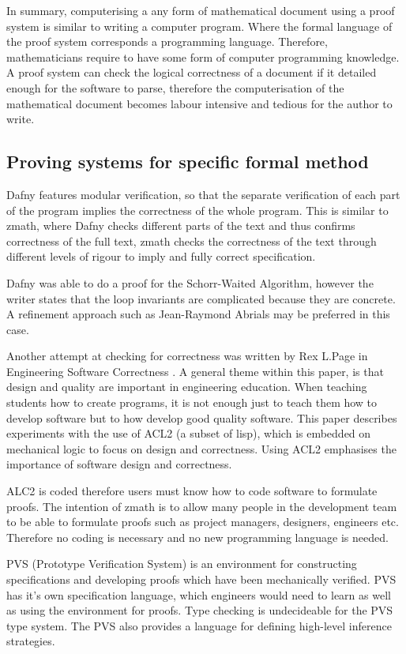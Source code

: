 In summary, computerising a any form of mathematical document using a proof system is similar to writing a computer program. Where the formal language of the proof system corresponds a programming language. Therefore, mathematicians require to have some form of computer programming knowledge. A proof system can check the logical correctness of a document if it detailed enough for the software to parse, therefore the computerisation of the mathematical document becomes labour intensive and tedious for the author to write.

\subsection{Proving systems for specific formal method}


Dafny \cite{dafny} features modular verification, so that the separate verification of each part of the program implies the correctness of the whole program. This is similar to \gls{zmath}, where Dafny checks different parts of the text and thus confirms correctness of the full text, \gls{zmath} checks the correctness of the text through different levels of rigour to imply and fully correct specification.

Dafny was able to do a proof for the Schorr-Waited Algorithm, however the writer states that the loop invariants are complicated because they are concrete. A refinement approach such as Jean-Raymond Abrials \cite{abrial} may be preferred in this case.  

Another attempt at checking for correctness was written by Rex L.Page in Engineering Software Correctness \cite{engineeringsoftwarecorrectness}. A general theme within this paper, is that design and quality are important in engineering education. When teaching students how to create programs, it is not enough just to teach them how to develop software but to how develop good quality software. This paper describes experiments with the use of ACL2 (a subset of lisp), which is embedded on mechanical logic to focus on design and correctness. Using ACL2 emphasises the importance of software design and correctness. 

ALC2 is coded therefore users must know how to code software to formulate proofs. The intention of \gls{zmath} is to allow many people in the development team to be able to formulate proofs such as project managers, designers, engineers etc. Therefore no coding is necessary and no new programming language is needed.

PVS (Prototype Verification System) \cite{pvs} is an environment for constructing specifications and developing proofs which have been mechanically verified. PVS has it's own specification language, which engineers would need to learn as well as using the environment for proofs. Type checking is undecideable for the PVS type system. The PVS also provides a language for defining high-level inference strategies.


